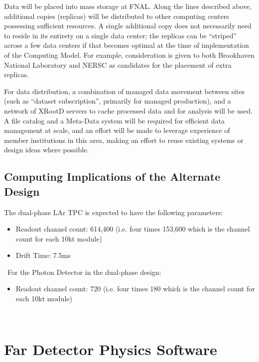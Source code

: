 Data will be placed into mass storage at FNAL. Along the lines described above, additional copies (replicas) will be distributed to other
computing centers possessing sufficient resources.
A single additional copy does not necessarily need to reside in its entirety on a single data center; the replicas can be ``striped'' across a few data centers if that
becomes optimal at the time of implementation of the Computing Model. For example, consideration is given to both Brookhaven National Laboratory
and NERSC as candidates for the placement of extra replicas.

For data distribution, a combination of managed data movement between sites (such as ``dataset subscription'',
primarily for managed production), and a network of XRootD servers to cache processed data and for analysis will be used.
A file catalog and a Meta-Data system will be required for efficient data management at scale, and an effort will be made to leverage experience of
member institutions in this area, making an effort to reuse existing systems or design ideas where possible.

\subsection{Computing Implications of the Alternate Design}
\label{sec:detectors-sc-alternate}
The dual-phase LAr TPC is expected to have the following parameters:
\begin{itemize}
	\item Readout channel count: 614,400 (i.e. four times 153,600 which is the channel count
	for each 10kt module)
	\item Drift Time: 7.5ms
\end{itemize}
\
For the Photon Detector in the dual-phase design:
\begin{itemize}
	\item Readout channel count: 720 (i.e. four times 180 which is the channel count
	for each 10kt module)
\end{itemize}
\
\section{Far Detector Physics Software}
\label{sec:detectors-sc-physics-software}

